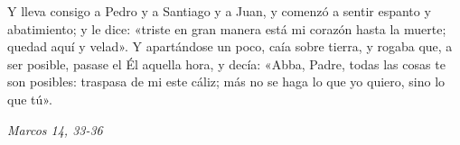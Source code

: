 \documentclass[../../devocionario.tex]{subfiles}
\begin{document}
    Y lleva consigo a Pedro y a Santiago y a Juan, y comenzó a sentir espanto y abatimiento; y le dice: 
    «triste en gran manera está mi corazón hasta la muerte; quedad aquí y velad». Y apartándose un poco, 
    caía sobre tierra, y rogaba que, a ser posible, pasase el Él aquella hora, y decía: «Abba, Padre, todas las cosas te son posibles: 
    traspasa de mi este cáliz; más no se haga lo que yo quiero, sino lo que tú».
    
    \begin{flushright}
        \textit{Marcos 14, 33-36}
    \end{flushright}
\end{document}

